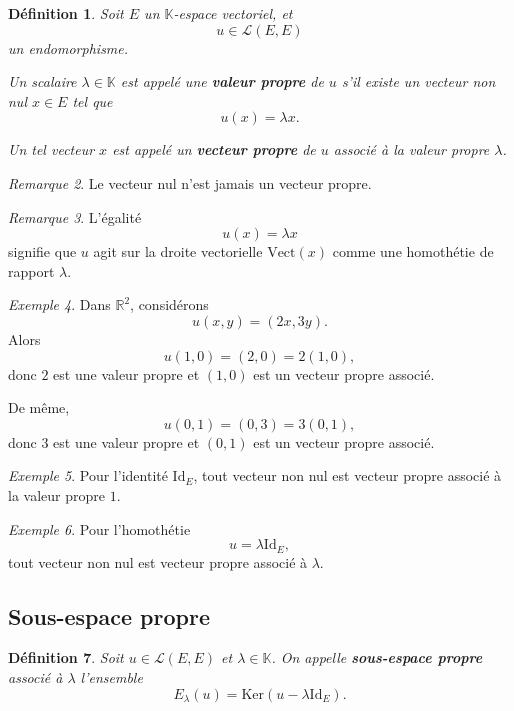 \documentclass[11pt,a4paper]{article}
\newtheorem{definition}{Définition}[section]
\theoremstyle{remark}
\newtheorem{remarque}[definition]{Remarque}
\newtheorem{exemple}[definition]{Exemple}
\newcommand{\R}{\mathbb{R}}
\newcommand{\K}{\mathbb{K}}
\newcommand{\Vect}{\mathrm{Vect}}
\newcommand{\Ker}{\mathrm{Ker}}
\newcommand{\id}{\mathrm{Id}}
\begin{document}
\begin{definition}
Soit \(E\) un \(\K\)-espace vectoriel, et
\[
u\in \mathcal L(E,E)
\]
un endomorphisme.

Un scalaire \(\lambda\in\K\) est appelé une \textbf{valeur propre} de \(u\) s’il existe un vecteur non nul \(x\in E\) tel que
\[
u(x)=\lambda x.
\]

Un tel vecteur \(x\) est appelé un \textbf{vecteur propre} de \(u\) associé à la valeur propre \(\lambda\).
\end{definition}

\begin{remarque}
Le vecteur nul n’est jamais un vecteur propre.
\end{remarque}

\begin{remarque}
L’égalité
\[
u(x)=\lambda x
\]
signifie que \(u\) agit sur la droite vectorielle \(\Vect(x)\) comme une homothétie de rapport \(\lambda\).
\end{remarque}

\begin{exemple}
Dans \(\R^2\), considérons
\[
u(x,y)=(2x,3y).
\]
Alors
\[
u(1,0)=(2,0)=2(1,0),
\]
donc \(2\) est une valeur propre et \((1,0)\) est un vecteur propre associé.

De même,
\[
u(0,1)=(0,3)=3(0,1),
\]
donc \(3\) est une valeur propre et \((0,1)\) est un vecteur propre associé.
\end{exemple}

\begin{exemple}
Pour l’identité \(\id_E\), tout vecteur non nul est vecteur propre associé à la valeur propre \(1\).
\end{exemple}

\begin{exemple}
Pour l’homothétie
\[
u=\lambda \id_E,
\]
tout vecteur non nul est vecteur propre associé à \(\lambda\).
\end{exemple}

\subsection{Sous-espace propre}

\begin{definition}
Soit \(u\in\mathcal L(E,E)\) et \(\lambda\in\K\).  
On appelle \textbf{sous-espace propre} associé à \(\lambda\) l’ensemble
\[
E_\lambda(u)=\Ker(u-\lambda\id_E).
\]
\end{definition}
\end{document}
